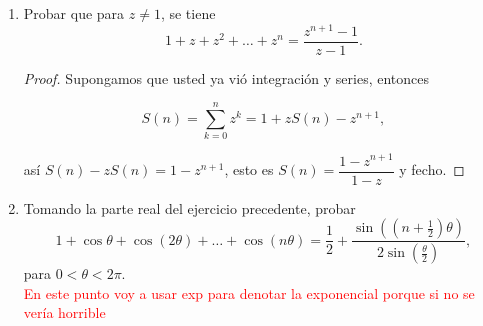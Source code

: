 \documentclass[11pt]{article}
\begin{document}
\begin{enumerate}
    \begin{proof}
    Escribimos $z=a+bi$ e igualamos a 0, así, para el seno tenemos:
    \begin{align*}
    \sin{z}=\dfrac{e^{iz}-e^{-iz}}{2i}&=0\\
    e^{i(a+bi)}-e^{-i(a+bi)}&=0\\
    e^{-b+ai}-e^{b-ai}&=0\\ 
    e^{-b+ai}&=e^{b-ai}\\ 
    e^{-b}e^{ai}&=e^{b}e^{-ai}\\ 
    e^{2ai}&=e^{2b}
    \end{align*}
    
    Como $|e^{2ai}|=|e^{2b}|=1$ y además $2b$ es un número real, tenemos que $e^{2b}=1$ y por la inyectividad de la exponencial en los reales, $b=0$, luego resolvemos la ecuación
    \[
    e^{2ai}=1
    \]
    Es decir \[
    e^{ai}=\pm 1
    \]
    Si hace las cuentas va a ver que los ceros de esa vaina son el conjunto $A=\{\theta\in\mathbb{R}: \theta=k\pi, k\in\mathbb{Z}\}$.

    Para el coseno la cuenta es basicamente la misma pero la ecuación al final es
    \[
    e^{2ai}=-e^{2b}
    \]
    Y pues resolviendo de la misma manera se llega a que los ceros son el conjunto $B=\{\theta\in\mathbb{R}:\theta=\frac{\pi}{2}+k\pi, k\in\mathbb{Z}\}$

    \end{proof}

    \item Probar que para $z \neq 1$, se tiene
    \[
    1 + z + z^2 + \dots + z^n = \dfrac{z^{n+1} - 1}{z - 1}.
    \]

    \begin{proof}
    Supongamos que usted ya vió integración y series, entonces

    $$S(n)=\sum_{k=0}^{n} z^k=1+zS(n)-z^{n+1},$$

    así $S(n)-zS(n)=1-z^{n+1}$, esto es $S(n)=\dfrac{1-z^{n+1}}{1-z}$ y fecho. 
    \end{proof}

    \item Tomando la parte real del ejercicio precedente, probar
    \[
    1 + \cos \theta + \cos(2\theta) + \dots + \cos(n\theta) = \frac{1}{2} + \frac{\sin\left((n + \frac{1}{2})\theta\right)}{2 \sin\left(\frac{\theta}{2}\right)},
    \]
    para $0 < \theta < 2\pi$.\\

    \textcolor{red}{En este punto voy a usar exp para denotar la exponencial porque si no se vería horrible}


\end{enumerate}
\end{document}
